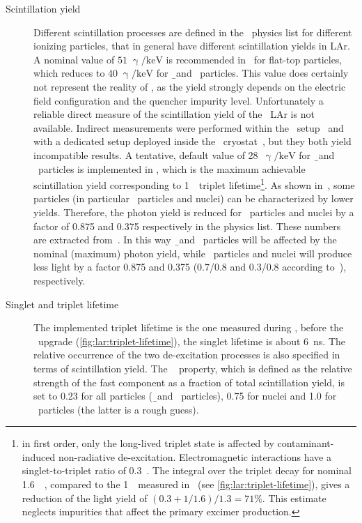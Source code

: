 \begin{description}
  \item[Scintillation yield] Different scintillation processes are defined in the \mage\
    physics list for different ionizing particles, that in general have different
    scintillation yields in LAr. A nominal value of $51\;\upgamma/\text{keV}$ is
    recommended in~\cite{Doke2002, Doke1988} for flat-top particles, which reduces to
    $40\;\upgamma/\text{keV}$ for \b\ and \g\ particles. This value does certainly not
    represent the reality of \gerda, as the yield strongly depends on the electric field
    configuration and the quencher impurity level. Unfortunately a reliable direct measure
    of the scintillation yield of the \gerda\ LAr is not available. Indirect measurements
    were performed within the \LArGe\ setup~\cite{Lehnert2016} and with a dedicated setup
    deployed inside the \gerda\ cryostat~\cite{Barros2020}, but they both yield
    incompatible results. A tentative, default value of 28~$\upgamma/\text{keV}$ for \b\
    and \g\ particles is implemented in \mage, which is the maximum achievable
    scintillation yield corresponding to 1~\mus\ triplet lifetime\footnote{%
      in first order, only the long-lived triplet state is affected by contaminant-induced
      non-radiative de-excitation. Electromagnetic interactions have a singlet-to-triplet
      ratio of 0.3~\cite{Doke2002}. The integral over the triplet decay for nominal
      1.6~\mus~\cite{Doke2002}, compared to the 1~\mus\ measured in \gerda\ (see
      \cref{fig:lar:triplet-lifetime}), gives a reduction of the light yield of $(0.3 +
      1/1.6)/1.3 = 71\%$. This estimate neglects impurities that affect the primary
      excimer production.
    }.
    As shown in~\cite{Doke2002}, some particles (in particular \a\ particles and nuclei)
    can be characterized by lower yields. Therefore, the photon yield is reduced for \a\
    particles and nuclei by a factor of 0.875 and 0.375 respectively in the physics list.
    These numbers are extracted from~\cite{Doke2002}. In this way \b\ and \g\ particles
    will be affected by the nominal (maximum) photon yield, while \a\ particles and nuclei
    will produce less light by a factor 0.875 and 0.375 (0.7/0.8 and 0.3/0.8 according
    to~\cite{Doke2002}), respectively.

  \item[Singlet and triplet lifetime] \sloppy The implemented triplet lifetime is the one
    measured during \gerdatwo, before the \phasetwop\ upgrade
    (\cref{fig:lar:triplet-lifetime}), the singlet lifetime is about 6~ns. The relative
    occurrence of the two de-excitation processes is also specified in terms of
    scintillation yield. The \geant\ \m{YIELDRATIO} property, which is defined as the
    relative strength of the fast component as a fraction of total scintillation yield, is
    set to 0.23 for all particles (\b{}nd \g\ particles), 0.75 for nuclei and 1.0 for \a\
    particles (the latter is a rough guess).


\end{description}
